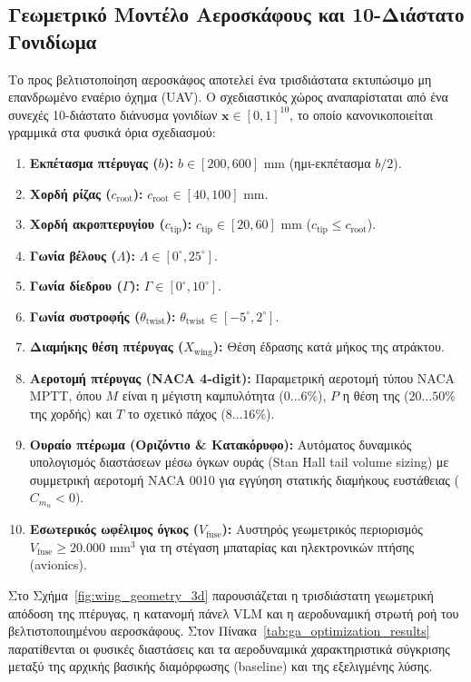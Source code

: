 \subsection{Γεωμετρικό Μοντέλο Αεροσκάφους και 10-Διάστατο Γονιδίωμα}
Το προς βελτιστοποίηση αεροσκάφος αποτελεί ένα τρισδιάστατα εκτυπώσιμο μη επανδρωμένο εναέριο όχημα (UAV). Ο σχεδιαστικός χώρος αναπαρίσταται από ένα συνεχές 10-διάστατο διάνυσμα γονιδίων $\mathbf{x} \in [0, 1]^{10}$, το οποίο κανονικοποιείται γραμμικά στα φυσικά όρια σχεδιασμού:
\begin{enumerate}
    \item \textbf{Εκπέτασμα πτέρυγας ($b$):} $b \in [200, 600]\text{ mm}$ (ημι-εκπέτασμα $b/2$).
    \item \textbf{Χορδή ρίζας ($c_{\text{root}}$):} $c_{\text{root}} \in [40, 100]\text{ mm}$.
    \item \textbf{Χορδή ακροπτερυγίου ($c_{\text{tip}}$):} $c_{\text{tip}} \in [20, 60]\text{ mm}$ ($c_{\text{tip}} \le c_{\text{root}}$).
    \item \textbf{Γωνία βέλους ($\Lambda$):} $\Lambda \in [0^\circ, 25^\circ]$.
    \item \textbf{Γωνία δίεδρου ($\Gamma$):} $\Gamma \in [0^\circ, 10^\circ]$.
    \item \textbf{Γωνία συστροφής ($\theta_{\text{twist}}$):} $\theta_{\text{twist}} \in [-5^\circ, 2^\circ]$.
    \item \textbf{Διαμήκης θέση πτέρυγας ($X_{\text{wing}}$):} Θέση έδρασης κατά μήκος της ατράκτου.
    \item \textbf{Αεροτομή πτέρυγας (NACA 4-digit):} Παραμετρική αεροτομή τύπου NACA MPTT, όπου $M$ είναι η μέγιστη καμπυλότητα ($0\dots 6\%$), $P$ η θέση της ($20\dots 50\%$ της χορδής) και $T$ το σχετικό πάχος ($8\dots 16\%$).
    \item \textbf{Ουραίο πτέρωμα (Οριζόντιο \& Κατακόρυφο):} Αυτόματος δυναμικός υπολογισμός διαστάσεων μέσω όγκων ουράς (Stan Hall tail volume sizing) με συμμετρική αεροτομή NACA 0010 για εγγύηση στατικής διαμήκους ευστάθειας ($C_{m_\alpha} < 0$).
    \item \textbf{Εσωτερικός ωφέλιμος όγκος ($V_{\text{fuse}}$):} Αυστηρός γεωμετρικός περιορισμός $V_{\text{fuse}} \ge 20.000\text{ mm}^3$ για τη στέγαση μπαταρίας και ηλεκτρονικών πτήσης (avionics).
\end{enumerate}

Στο Σχήμα~\ref{fig:wing_geometry_3d} παρουσιάζεται η τρισδιάστατη γεωμετρική απόδοση της πτέρυγας, η κατανομή πάνελ VLM και η αεροδυναμική στρωτή ροή του βελτιστοποιημένου αεροσκάφους. Στον Πίνακα~\ref{tab:ga_optimization_results} παρατίθενται οι φυσικές διαστάσεις και τα αεροδυναμικά χαρακτηριστικά σύγκρισης μεταξύ της αρχικής βασικής διαμόρφωσης (baseline) και της εξελιγμένης λύσης.

